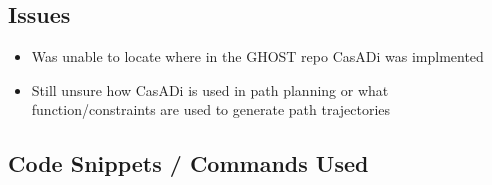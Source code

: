 \subsection*{Issues}
\begin{itemize}
    \item Was unable to locate where in the GHOST repo CasADi was implmented
    \item Still unsure how CasADi is used in path planning or what function/constraints are used to generate path trajectories
\end{itemize}

\subsection*{Code Snippets / Commands Used}
\begin{lstlisting}
     
\end{lstlisting}


